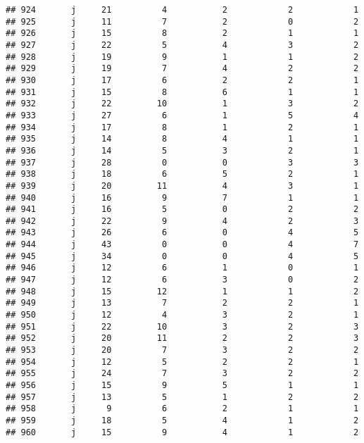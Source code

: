 \documentclass[
]{article}
\begin{document}
\begin{verbatim}
## 924       j     21          4           2            2            1
## 925       j     11          7           2            0            2
## 926       j     15          8           2            1            1
## 927       j     22          5           4            3            2
## 928       j     19          9           1            1            2
## 929       j     19          7           4            2            2
## 930       j     17          6           2            2            1
## 931       j     15          8           6            1            1
## 932       j     22         10           1            3            2
## 933       j     27          6           1            5            4
## 934       j     17          8           1            2            1
## 935       j     14          8           4            1            1
## 936       j     14          5           3            2            1
## 937       j     28          0           0            3            3
## 938       j     18          6           5            2            1
## 939       j     20         11           4            3            1
## 940       j     16          9           7            1            1
## 941       j     16          5           0            2            2
## 942       j     22          9           4            2            3
## 943       j     26          6           0            4            5
## 944       j     43          0           0            4            7
## 945       j     34          0           0            4            5
## 946       j     12          6           1            0            1
## 947       j     12          6           3            0            2
## 948       j     15         12           1            1            2
## 949       j     13          7           2            2            1
## 950       j     12          4           3            2            1
## 951       j     22         10           3            2            3
## 952       j     20         11           2            2            3
## 953       j     20          7           3            2            2
## 954       j     12          5           2            2            1
## 955       j     24          7           3            2            2
## 956       j     15          9           5            1            1
## 957       j     13          5           1            2            2
## 958       j      9          6           2            1            1
## 959       j     18          5           4            1            2
## 960       j     15          9           4            1            2

\end{verbatim}
\end{document}

